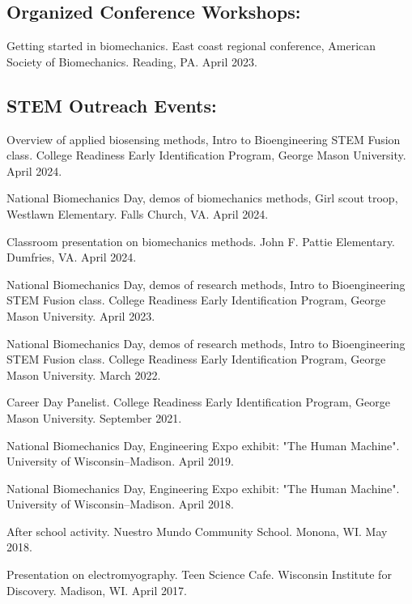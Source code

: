 \documentclass[letterpaper, 10pt]{article}
\begin{document}
\subsection{Organized Conference Workshops:}
\begin{compactenum} %
     \item Getting started in biomechanics. East coast regional conference, American Society of Biomechanics. Reading, PA. April 2023.
\end{compactenum} %

\subsection{STEM Outreach Events:}
\begin{compactenum}
    \item Overview of applied biosensing methods, Intro to Bioengineering STEM Fusion class. College Readiness Early Identification Program, George Mason University. April 2024.
    \item National Biomechanics Day, demos of biomechanics methods, Girl scout troop, Westlawn Elementary. Falls Church, VA. April 2024.
    \item Classroom presentation on biomechanics methods. John F. Pattie Elementary. Dumfries, VA. April 2024.
    \item National Biomechanics Day, demos of research methods, Intro to Bioengineering STEM Fusion class. College Readiness Early Identification Program, George Mason University. April 2023.
    \item National Biomechanics Day, demos of research methods, Intro to Bioengineering STEM Fusion class. College Readiness Early Identification Program, George Mason University. March 2022.
    \item Career Day Panelist. College Readiness Early Identification Program, George Mason University. September 2021.
    \item National Biomechanics Day, Engineering Expo exhibit: "The Human Machine". University of Wisconsin–Madison. April 2019. 
    \item National Biomechanics Day, Engineering Expo exhibit: "The Human Machine". University of Wisconsin–Madison. April 2018. 
    \item After school activity. Nuestro Mundo Community School. Monona, WI. May 2018.
    \item Presentation on electromyography. Teen Science Cafe. Wisconsin Institute for Discovery. Madison, WI. April 2017.

\end{compactenum}
\end{document}
